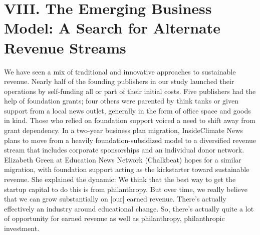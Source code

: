 \chapter{VIII. The Emerging Business Model: A Search for Alternate Revenue Streams}
We have seen a mix of traditional and innovative approaches to sustainable
revenue. Nearly half of the founding publishers in our study launched their
operations by self-funding all or part of their initial costs. Five publishers
had the help of foundation grants; four others were parented by think tanks
or given support from a local news outlet, generally in the form of office
space and goods in kind.
Those who relied on foundation support voiced a need to shift away from
grant dependency. In a two-year business plan migration, InsideClimate
News plans to move from a heavily foundation-subsidized model to a
diversified revenue stream that includes corporate sponsorships and an
individual donor network. Elizabeth Green at Education News Network
(Chalkbeat) hopes for a similar migration, with foundation support acting
as the kickstarter toward sustainable revenue. She explained the dynamic:
We think that the best way to get the startup capital to do this is from
philanthropy. But over time, we really believe that we can grow substantially
on [our] earned revenue.
There’s actually effectively an industry around educational change.
So, there’s actually quite a lot of opportunity for earned revenue as
well as philanthropy, philanthropic investment.

